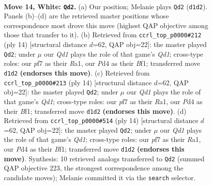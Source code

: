 \documentclass[11pt]{article}
\begin{document}
\clearpage

\begin{figure}[p]\centering
\begin{subfigure}{0.46\textwidth}\centering
\resizebox{\linewidth}{!}{%
\newchessgame
\chessboard[
  setfen={r1bq1rk1/1p1n1ppp/n1p1p3/p2pP3/3P1P2/2N2N2/PPP3PP/2RQKB1R w K - 2 14},
  showmover=false,
  pgfstyle=straightmove, color=movearrow, markmove={d1-d2}
]}
\caption{}
\end{subfigure}\hfill
\begin{subfigure}{0.46\textwidth}\centering
\resizebox{\linewidth}{!}{%
\newchessgame
\chessboard[
  setfen={rnbq1rk1/pp2ppbp/3p1np1/8/3NP3/2N1BP2/PPP3PP/R2QKB1R w KQ - 1 8},
  showmover=false,
  pgfstyle=straightmove, color=movearrow, markmove={d1-d2}
]}
\caption{}
\end{subfigure}
\\[4pt]
\begin{subfigure}{0.46\textwidth}\centering
\resizebox{\linewidth}{!}{%
\newchessgame
\chessboard[
  setfen={rnbq1rk1/pp2ppbp/3p1np1/8/3NP3/2N1BP2/PPP3PP/R2QKB1R w KQ - 1 8},
  showmover=false,
  pgfstyle=straightmove, color=movearrow, markmove={d1-d2}
]}
\caption{}
\end{subfigure}\hfill
\begin{subfigure}{0.46\textwidth}\centering
\resizebox{\linewidth}{!}{%
\newchessgame
\chessboard[
  setfen={rnbq1rk1/pp2ppbp/3p1np1/8/3NP3/2N1BP2/PPP3PP/R2QKB1R w KQ - 1 8},
  showmover=false,
  pgfstyle=straightmove, color=movearrow, markmove={d1-d2}
]}
\caption{}
\end{subfigure}
\caption{\textbf{Move 14, White: \texttt{Qd2}.} (a) Our position; Melanie plays \texttt{Qd2} (\texttt{d1d2}). Panels (b)--(d) are the retrieved master positions whose correspondence most drove this move (highest QAP objective among those that transfer to it). (b) Retrieved from \texttt{ccrl\_top\_p0000\#212} (ply 14) [structural distance $d$=62, QAP obj=22]: the master played \texttt{Qd2}; under $\mu$ our \emph{Qd1} plays the role of that game's \emph{Qd1}; cross-type roles: our \emph{p}f7 as their \emph{R}a1, our \emph{P}d4 as their \emph{B}f1; transferred move \texttt{d1d2} \textbf{(endorses this move)}. (c) Retrieved from \texttt{ccrl\_top\_p0000\#213} (ply 14) [structural distance $d$=62, QAP obj=22]: the master played \texttt{Qd2}; under $\mu$ our \emph{Qd1} plays the role of that game's \emph{Qd1}; cross-type roles: our \emph{p}f7 as their \emph{R}a1, our \emph{P}d4 as their \emph{B}f1; transferred move \texttt{d1d2} \textbf{(endorses this move)}. (d) Retrieved from \texttt{ccrl\_top\_p0000\#514} (ply 14) [structural distance $d$=62, QAP obj=22]: the master played \texttt{Qd2}; under $\mu$ our \emph{Qd1} plays the role of that game's \emph{Qd1}; cross-type roles: our \emph{p}f7 as their \emph{R}a1, our \emph{P}d4 as their \emph{B}f1; transferred move \texttt{d1d2} \textbf{(endorses this move)}. Synthesis: 10 retrieved analogs transferred to \texttt{Qd2} (summed QAP objective 223, the strongest correspondence among the candidate moves); Melanie committed it via the \texttt{search} selector.}
\label{fig:thought-m26}
\end{figure}
\end{document}
